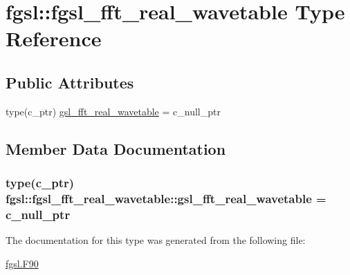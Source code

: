 \hypertarget{structfgsl_1_1fgsl__fft__real__wavetable}{\section{fgsl\-:\-:fgsl\-\_\-fft\-\_\-real\-\_\-wavetable Type Reference}
\label{structfgsl_1_1fgsl__fft__real__wavetable}
}
\subsection*{Public Attributes}
\begin{DoxyCompactItemize}
\item 
type(c\-\_\-ptr) \hyperlink{structfgsl_1_1fgsl__fft__real__wavetable_aab5a383cf301df5551ecbe80a1ca3044}{gsl\-\_\-fft\-\_\-real\-\_\-wavetable} = c\-\_\-null\-\_\-ptr
\end{DoxyCompactItemize}


\subsection{Member Data Documentation}
\hypertarget{structfgsl_1_1fgsl__fft__real__wavetable_aab5a383cf301df5551ecbe80a1ca3044}{
\subsubsection[{gsl\-\_\-fft\-\_\-real\-\_\-wavetable}]{\setlength{\rightskip}{0pt plus 5cm}type(c\-\_\-ptr) fgsl\-::fgsl\-\_\-fft\-\_\-real\-\_\-wavetable\-::gsl\-\_\-fft\-\_\-real\-\_\-wavetable = c\-\_\-null\-\_\-ptr}}\label{structfgsl_1_1fgsl__fft__real__wavetable_aab5a383cf301df5551ecbe80a1ca3044}


The documentation for this type was generated from the following file\-:\begin{DoxyCompactItemize}
\item 
\hyperlink{fgsl_8F90}{fgsl.\-F90}\end{DoxyCompactItemize}
